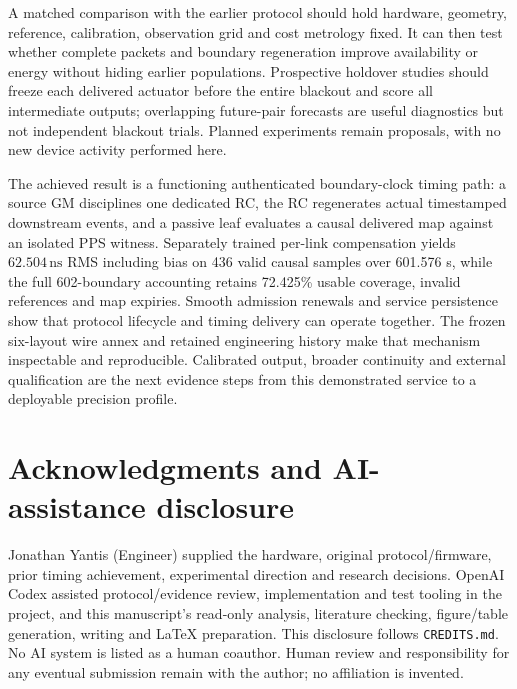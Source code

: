\documentclass[11pt,letterpaper]{article}
\newcommand{\ns}{\,\mathrm{ns}}\newcommand{\us}{\,\mu\mathrm{s}}\newcommand{\ms}{\,\mathrm{ms}}\newcommand{\ppb}{\,\mathrm{ppb}}\newcommand{\code}[1]{\texttt{#1}}\newcolumntype{L}[1]{>{\RaggedRight\arraybackslash}p{#1}}
\begin{document}
A matched comparison with the earlier protocol should hold hardware, geometry, reference, calibration, observation grid and cost metrology fixed. It can then test whether complete packets and boundary regeneration improve availability or energy without hiding earlier populations. Prospective holdover studies should freeze each delivered actuator before the entire blackout and score all intermediate outputs; overlapping future-pair forecasts are useful diagnostics but not independent blackout trials. Planned experiments remain proposals, with no new device activity performed here.

The achieved result is a functioning authenticated boundary-clock timing path: a source GM disciplines one dedicated RC, the RC regenerates actual timestamped downstream events, and a passive leaf evaluates a causal delivered map against an isolated PPS witness. Separately trained per-link compensation yields $62.504\ns$ RMS including bias on 436 valid causal samples over 601.576 s, while the full 602-boundary accounting retains 72.425\% usable coverage, invalid references and map expiries. Smooth admission renewals and service persistence show that protocol lifecycle and timing delivery can operate together. The frozen six-layout wire annex and retained engineering history make that mechanism inspectable and reproducible. Calibrated output, broader continuity and external qualification are the next evidence steps from this demonstrated service to a deployable precision profile.

\section*{Acknowledgments and AI-assistance disclosure}
Jonathan Yantis (Engineer) supplied the hardware, original protocol/firmware, prior timing achievement, experimental direction and research decisions. OpenAI Codex assisted protocol/evidence review, implementation and test tooling in the project, and this manuscript's read-only analysis, literature checking, figure/table generation, writing and LaTeX preparation. This disclosure follows \code{CREDITS.md}. No AI system is listed as a human coauthor. Human review and responsibility for any eventual submission remain with the author; no affiliation is invented.
\end{document}
